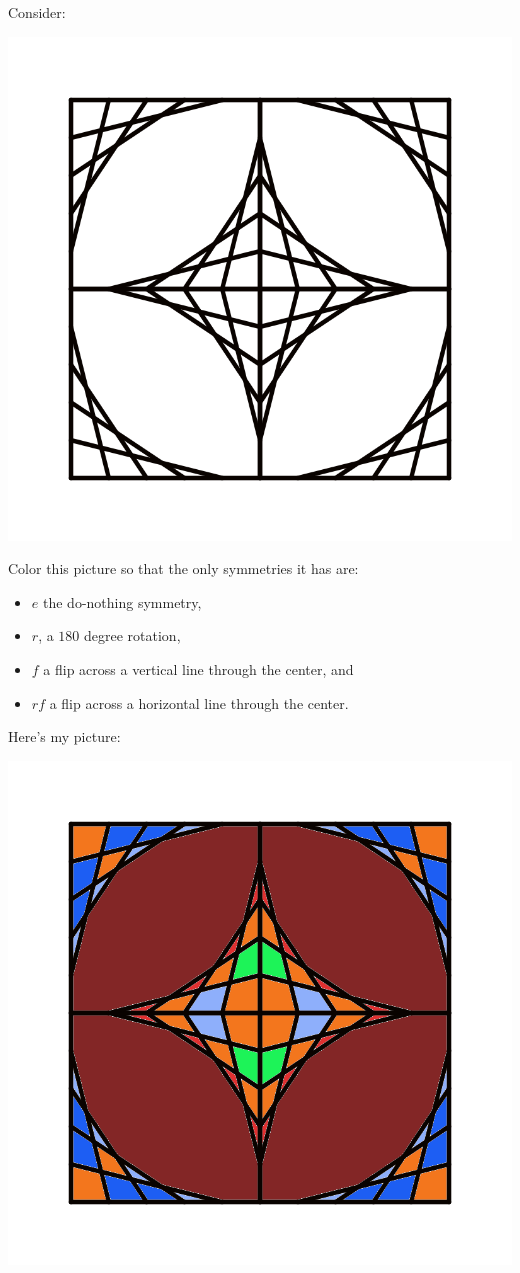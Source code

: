 \documentclass[noauthor,nooutcomes,12pt,hints]{ximera}
\begin{document}
\begin{question}
  Consider:
   \begin{center}
  \includegraphics[width=.6\textwidth]{etD4.png}
 \end{center}
   Color this picture so that the only symmetries it has are:
   \begin{itemize}
   \item $e$ the do-nothing symmetry,
   \item $r$, a $180$ degree rotation, 
   \item $f$ a flip across a vertical line through the center, and
   \item $rf$ a flip across a horizontal line through the center.
   \end{itemize}
   \begin{freeResponse}
   Here's my picture:
   \begin{center}
     \includegraphics[width=.6\textwidth]{ciD4.png}
   \end{center}
 \end{freeResponse}

\end{question}
\mynewpage
\end{document}
